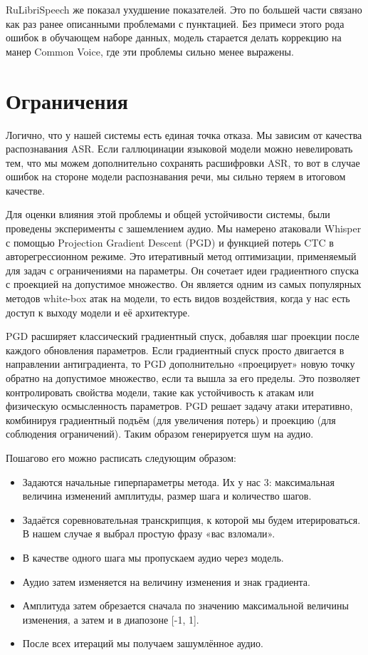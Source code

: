 RuLibriSpeech же показал ухудшение показателей.
Это по большей части связано как раз ранее описанными проблемами с пунктацией.
Без примеси этого рода ошибок в обучающем наборе данных, модель старается делать коррекцию на манер Common Voice, где эти проблемы сильно менее выражены.

\section{Ограничения}

Логично, что у нашей системы есть единая точка отказа.
Мы зависим от качества распознавания ASR.
Если галлюцинации языковой модели можно невелировать тем, что мы можем дополнительно сохранять расшифровки ASR, то вот в случае ошибок на стороне модели распознавания речи, мы сильно теряем в итоговом качестве.

Для оценки влияния этой проблемы и общей устойчивости системы, были проведены эксперименты с зашемлением аудио.
Мы намерено атаковали Whisper с помощью Projection Gradient Descent (PGD) и функцией потерь CTC в авторегрессионном режиме.
Это итеративный метод оптимизации, применяемый для задач с ограничениями на параметры.
Он сочетает идеи градиентного спуска с проекцией на допустимое множество.
Он является одним из самых популярных методов white-box атак на модели, то есть видов воздействия, когда у нас есть доступ к выходу модели и её архитектуре.

PGD расширяет классический градиентный спуск, добавляя шаг проекции после каждого обновления параметров.
Если градиентный спуск просто двигается в направлении антиградиента, то PGD дополнительно «проецирует» новую точку обратно на допустимое множество, если та вышла за его пределы.
Это позволяет контролировать свойства модели, такие как устойчивость к атакам или физическую осмысленность параметров.
PGD решает задачу атаки итеративно, комбинируя градиентный подъём (для увеличения потерь) и проекцию (для соблюдения ограничений).
Таким образом генерируется шум на аудио.

Пошагово его можно расписать следующим образом:
\begin{itemize}
  \item Задаются начальные гиперпараметры метода.
  Их у нас 3: максимальная величина изменений амплитуды, размер шага и количество шагов.
  \item Задаётся соревновательная транскрипция, к которой мы будем итерироваться.
  В нашем случае я выбрал простую фразу «вас взломали».
  \item В качестве одного шага мы пропускаем аудио через модель.
  \item Аудио затем изменяется на величину изменения и знак градиента.
  \item Амплитуда затем обрезается сначала по значению максимальной величины изменения, а затем и в диапозоне [-1, 1].
  \item После всех итераций мы получаем зашумлённое аудио.
\end{itemize}

